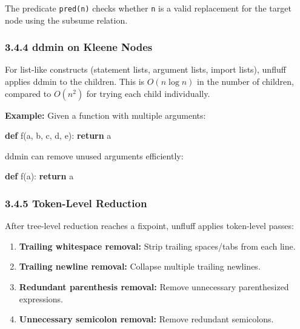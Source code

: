 \documentclass[
  letterpaper,
]{article}
\newenvironment{Shaded}{\begin{snugshade}}{\end{snugshade}}
\newcommand{\ControlFlowTok}[1]{\textcolor[rgb]{0.00,0.23,0.31}{\textbf{#1}}}
\newcommand{\KeywordTok}[1]{\textcolor[rgb]{0.00,0.23,0.31}{\textbf{#1}}}
\newcommand{\NormalTok}[1]{\textcolor[rgb]{0.00,0.23,0.31}{#1}}
\providecommand{\tightlist}{%
  \setlength{\itemsep}{0pt}\setlength{\parskip}{0pt}}
\begin{document}
The predicate \texttt{pred(n)} checks whether \texttt{n} is a valid
replacement for the target node using the subsume relation.

\subsubsection{3.4.4 ddmin on Kleene Nodes}\label{ddmin-on-kleene-nodes}

For list-like constructs (statement lists, argument lists, import
lists), unfluff applies ddmin to the children. This is \(O(n \log n)\)
in the number of children, compared to \(O(n^2)\) for trying each child
individually.

\textbf{Example:} Given a function with multiple arguments:

\begin{Shaded}
\begin{Highlighting}[]
\KeywordTok{def}\NormalTok{ f(a, b, c, d, e):}
    \ControlFlowTok{return}\NormalTok{ a}
\end{Highlighting}
\end{Shaded}

ddmin can remove unused arguments efficiently:

\begin{Shaded}
\begin{Highlighting}[]
\KeywordTok{def}\NormalTok{ f(a):}
    \ControlFlowTok{return}\NormalTok{ a}
\end{Highlighting}
\end{Shaded}

\subsubsection{3.4.5 Token-Level Reduction}\label{token-level-reduction}

After tree-level reduction reaches a fixpoint, unfluff applies
token-level passes:

\begin{enumerate}
\def\labelenumi{\arabic{enumi}.}
\tightlist
\item
  \textbf{Trailing whitespace removal:} Strip trailing spaces/tabs from
  each line.
\item
  \textbf{Trailing newline removal:} Collapse multiple trailing
  newlines.
\item
  \textbf{Redundant parenthesis removal:} Remove unnecessary
  parenthesized expressions.
\item
  \textbf{Unnecessary semicolon removal:} Remove redundant semicolons.
\end{enumerate}
\end{document}
